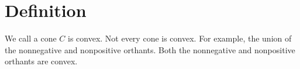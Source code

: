 
\section*{Definition}

We call a cone $C$ is convex.
Not every cone is convex. For example, the union of the nonnegative and nonpositive orthants.
Both the nonnegative and nonpositive orthants are convex.

\blankpage